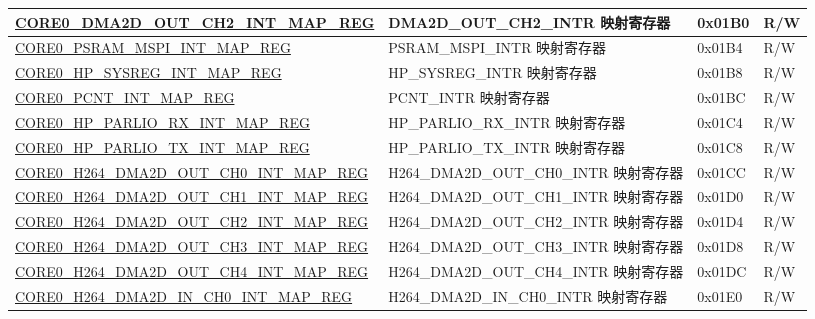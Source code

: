 \begin{longtable}{ | p{8.7cm} | p{6.2cm} | p{1.3cm} | p{1cm} | }
\hyperref[regdesc:CORE0DMA2DOUTCH2INTMAPREG]{CORE0\_DMA2D\_OUT\_CH2\_INT\_MAP\_REG} & DMA2D\_OUT\_CH2\_INTR 映射寄存器 & 0x01B0 & R/W \\ \hline

\hyperref[regdesc:CORE0PSRAMMSPIINTMAPREG]{CORE0\_PSRAM\_MSPI\_INT\_MAP\_REG} & PSRAM\_MSPI\_INTR 映射寄存器 & 0x01B4 & R/W \\ \hline

\hyperref[regdesc:CORE0HPSYSREGINTMAPREG]{CORE0\_HP\_SYSREG\_INT\_MAP\_REG} & HP\_SYSREG\_INTR 映射寄存器 & 0x01B8 & R/W \\ \hline

\hyperref[regdesc:CORE0PCNTINTMAPREG]{CORE0\_PCNT\_INT\_MAP\_REG} & PCNT\_INTR 映射寄存器 & 0x01BC & R/W \\ \hline

\hyperref[regdesc:CORE0HPPARLIORXINTMAPREG]{CORE0\_HP\_PARLIO\_RX\_INT\_MAP\_REG} & HP\_PARLIO\_RX\_INTR 映射寄存器 & 0x01C4 & R/W \\ \hline

\hyperref[regdesc:CORE0HPPARLIOTXINTMAPREG]{CORE0\_HP\_PARLIO\_TX\_INT\_MAP\_REG} & HP\_PARLIO\_TX\_INTR 映射寄存器 & 0x01C8 & R/W \\ \hline

\hyperref[regdesc:CORE0H264DMA2DOUTCH0INTMAPREG]{CORE0\_H264\_DMA2D\_OUT\_CH0\_INT\_MAP\_REG} & H264\_DMA2D\_OUT\_CH0\_INTR 映射寄存器 & 0x01CC & R/W \\ \hline

\hyperref[regdesc:CORE0H264DMA2DOUTCH1INTMAPREG]{CORE0\_H264\_DMA2D\_OUT\_CH1\_INT\_MAP\_REG} & H264\_DMA2D\_OUT\_CH1\_INTR 映射寄存器 & 0x01D0 & R/W \\ \hline

\hyperref[regdesc:CORE0H264DMA2DOUTCH2INTMAPREG]{CORE0\_H264\_DMA2D\_OUT\_CH2\_INT\_MAP\_REG} & H264\_DMA2D\_OUT\_CH2\_INTR 映射寄存器 & 0x01D4 & R/W \\ \hline

\hyperref[regdesc:CORE0H264DMA2DOUTCH3INTMAPREG]{CORE0\_H264\_DMA2D\_OUT\_CH3\_INT\_MAP\_REG} & H264\_DMA2D\_OUT\_CH3\_INTR 映射寄存器 & 0x01D8 & R/W \\ \hline

\hyperref[regdesc:CORE0H264DMA2DOUTCH4INTMAPREG]{CORE0\_H264\_DMA2D\_OUT\_CH4\_INT\_MAP\_REG} & H264\_DMA2D\_OUT\_CH4\_INTR 映射寄存器 & 0x01DC & R/W \\ \hline

\hyperref[regdesc:CORE0H264DMA2DINCH0INTMAPREG]{CORE0\_H264\_DMA2D\_IN\_CH0\_INT\_MAP\_REG} & H264\_DMA2D\_IN\_CH0\_INTR 映射寄存器 & 0x01E0 & R/W \\ \hline


\end{longtable}
